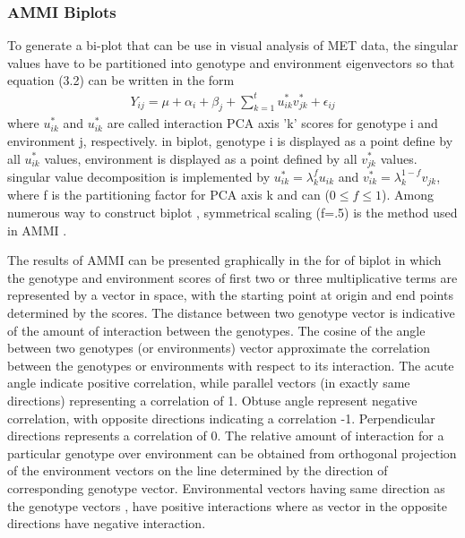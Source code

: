 \subsubsection{AMMI Biplots}
To generate a bi-plot that can be use in visual analysis of MET data, the singular values have to be partitioned into genotype and environment eigenvectors so that equation (3.2) can be written in the form
   \begin{eqnarray}
   Y_{ij}=\mu+\alpha_i +\beta_j+\sum_{k=1}^t  u_{ik}^*v_{jk}^*+\epsilon_{ij} 
   \end{eqnarray}
where $u_{ik}^*$ and $u_{ik}^*$ are called interaction PCA axis 'k' scores for genotype i and environment j, respectively. in biplot, genotype i is displayed as a point define by all $u_{ik}^*$ values, environment is displayed  as a point defined by all $v_{jk}^*$ values. singular value decomposition is implemented by $u_{ik}^*=\lambda_k^fu_{ik}$ and $v_{ik}^*=\lambda_k^{1-f}v_{jk}$, where f is the partitioning factor for PCA axis k and can ($0\leq f\leq1$). Among numerous way to construct biplot , symmetrical scaling (f=.5) is the method used in AMMI \citep{Gauch1988}.

The results of AMMI can be presented graphically in the for of biplot \citep{Shafii1998,Ebdon2002, Vargas1999} in which the genotype and environment scores of first two or three multiplicative terms are represented by a vector in space, with the starting point at origin and end points determined by the scores. The distance between two genotype vector is indicative of the amount of interaction between the genotypes. The cosine of the angle between two genotypes (or environments) vector approximate the correlation between the genotypes or environments with respect to its interaction. The acute angle indicate positive correlation, while parallel vectors (in exactly same directions) representing a correlation of 1. Obtuse angle represent negative correlation, with opposite directions indicating a correlation -1. Perpendicular directions represents a correlation of 0. The relative amount of interaction for a particular genotype over environment can be obtained from orthogonal projection of the environment vectors on the line determined by the direction of corresponding genotype vector. Environmental vectors having same direction as the genotype vectors , have positive interactions where as vector in the opposite directions have negative interaction.       

